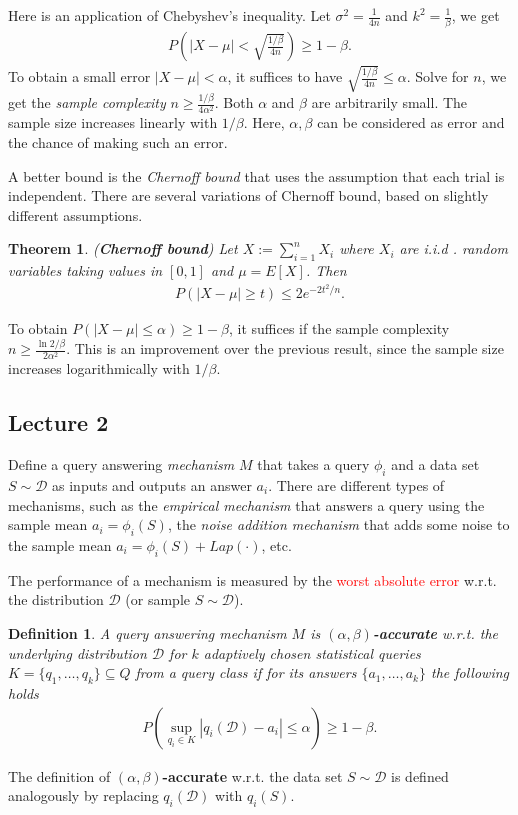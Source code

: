 \documentclass[]{article}
\newtheorem{theorem}{Theorem}[section]
\newtheorem{definition}{Definition}[section] %
\begin{document}
Here is an application of Chebyshev's inequality. Let $\sigma^2 = \frac{1}{4n}$ and $k^2 = \frac{1}{\beta}$, we get 
\begin{align*}
	P\left(|X-\mu| < \sqrt{\frac{1/\beta}{4n}}\right) \ge 1 - \beta.
\end{align*}
To obtain a small error $|X-\mu| < \alpha$, it suffices to have $\sqrt{\frac{1/\beta}{4n}} \le \alpha$. Solve for $n$, we get the \textit{sample complexity} $n\ge \frac{1/\beta}{4\alpha^2}$. Both $\alpha$ and $\beta$ are arbitrarily small. The sample size increases linearly with $1/\beta$. Here, $\alpha,\beta$ can be considered as error and the chance of making such an error. 

A better bound is the \textit{Chernoff bound} that uses the assumption that each trial is independent. There are several variations of Chernoff bound, based on slightly different assumptions. 

\begin{theorem} (\textbf{Chernoff bound})
	Let $X:= \sum_{i=1}^n X_i$ where $X_i$ are i.i.d . random variables taking values in $[0,1]$ and $\mu = E[X]$. Then 
	\begin{align*}
		P(|X-\mu| \ge t) \le 2e^{-2t^2/n}.
	\end{align*}
\end{theorem}
To obtain $P(|X-\mu| \le \alpha) \ge 1-\beta$, it suffices if the sample complexity $n \ge \frac{\ln 2/\beta}{2\alpha^2}$. This is an improvement over the previous result, since the sample size increases logarithmically with $1/\beta$.

\subsection{Lecture 2}
Define a query answering \textit{mechanism} $M$ that takes a query $\phi_i$ and a data set $S \sim \mathcal{D}$ as inputs and outputs an answer $a_i$. There are different types of mechanisms, such as the \textit{empirical mechanism} that answers a query using the sample mean $a_i = \phi_i(S)$, the \textit{noise addition mechanism} that adds some noise to the sample mean $a_i = \phi_i(S) + Lap(\cdot)$, etc. 

The performance of a mechanism is measured by the \textcolor{red}{worst absolute error} w.r.t. the distribution $\mathcal{D}$ (or sample $S\sim \mathcal{D}$). 

\begin{definition}
	A query answering mechanism $M$ is \textbf{$(\alpha,\beta)$-accurate} w.r.t. the underlying distribution $\mathcal{D}$ for $k$ adaptively chosen statistical queries $K=\{q_1,\dots,q_k\} \subseteq Q$ from a query class if for its answers $\{a_1, \dots, a_k\}$ the following holds
	\begin{align*}
	P\left(\sup_{q_i \in K}|q_i(\mathcal{D}) - a_i| \le \alpha \right) \ge 1 - \beta.
	\end{align*}
\end{definition}
The definition of \textbf{$(\alpha,\beta)$-accurate} w.r.t. the data set $S \sim \mathcal{D}$ is defined analogously by replacing $q_i(\mathcal{D})$ with $q_i(S)$. 
\end{document}
